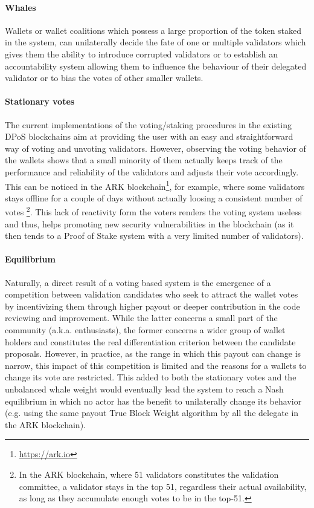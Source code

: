 \documentclass{article}
\begin{document}
\paragraph{Whales} Wallets or wallet coalitions which possess a large proportion of the token staked in the system, can unilaterally decide the fate of one or multiple validators which gives them the ability to introduce corrupted validators or to establish an accountability system allowing them to influence the behaviour of their delegated validator or to bias the votes of other smaller wallets.

\paragraph{Stationary votes}
The current implementations of the voting/staking procedures in the existing DPoS blockchains aim at providing the user with an easy and straightforward way of voting and unvoting validators. However, observing the voting behavior of the wallets shows that a small minority of them actually keeps track of the performance and reliability of the validators and adjusts their vote accordingly. This can be noticed in the ARK blockchain\footnote{\url{https://ark.io}}, for example, where some validators stays offline for a couple of days without actually loosing a consistent number of votes \footnote{In the ARK blockchain, where 51 validators constitutes the validation committee, a validator stays in the top 51, regardless their actual availability, as long as they accumulate enough votes to be in the top-51.}. This lack of reactivity form the voters renders the voting system useless and thus, helps promoting new security vulnerabilities in the blockchain (as it then tends to a Proof of Stake system with a very limited number of validators).

\paragraph{Equilibrium} Naturally, a direct result of a voting based system is the emergence of a competition between validation candidates who seek to attract the wallet votes by incentivizing them through higher payout or deeper contribution in the code reviewing and improvement. While the latter concerns a small part of the community (a.k.a. enthusiasts), the former concerns a wider group of wallet holders and constitutes the real differentiation criterion between the candidate proposals. However, in practice, as the range in which this payout can change is narrow, this impact of this competition is limited and the reasons for a wallets to change its vote are restricted. This added to both the stationary votes and the unbalanced whale weight would eventually lead the system to reach a Nash equilibrium \cite{maskin1999nash} in which no actor has the benefit to unilaterally change its behavior (e.g. using the same payout True Block Weight algorithm by all the delegate in the ARK blockchain). 
\end{document}
